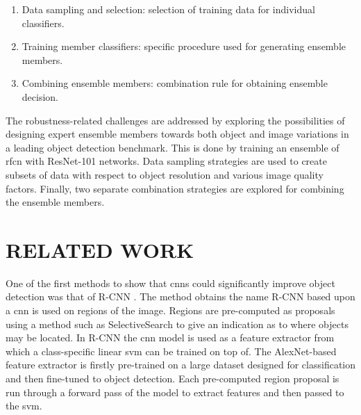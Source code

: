 \documentclass[a4paper,twoside]{article}
\begin{document}
\begin{enumerate}
	\item Data sampling and selection: selection of training data for individual classifiers.
	\item Training member classifiers: specific procedure used for generating ensemble members.
	\item Combining ensemble members: combination rule for obtaining ensemble decision.
\end{enumerate}

The robustness-related challenges are addressed by exploring the possibilities of designing expert ensemble members towards both object and image variations in a leading object detection benchmark. This is done by training an ensemble of \gls{rfcn} with ResNet-101 networks. Data sampling strategies are used to create subsets of data with respect to object resolution and various image quality factors. Finally, two separate combination strategies are explored for combining the ensemble members.

\section{\uppercase{Related Work}}
One of the first methods to show that \glspl{cnn} could significantly improve object detection was that of R-CNN \cite{rcnn}. The method obtains the name R-CNN based upon a \gls{cnn} is used on regions of the image. Regions are pre-computed as proposals using a method such as SelectiveSearch \cite{selectivesearch} to give an indication as to where objects may be located. In R-CNN the \gls{cnn} model is used as a feature extractor from which a class-specific linear \gls{svm} can be trained on top of. The AlexNet-based feature extractor is firstly pre-trained on a large dataset designed for classification and then fine-tuned to object detection. Each pre-computed region proposal is run through a forward pass of the model to extract features and then passed to the \gls{svm}.
\end{document}
